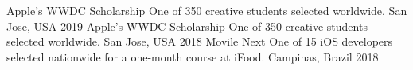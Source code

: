 \begin{cvhonors}
  \cvhonor
    {Apple's WWDC Scholarship}
    {One of 350 creative students selected worldwide.}
    {San Jose, USA}
    {2019}
  \cvhonor
    {Apple's WWDC Scholarship}
    {One of 350 creative students selected worldwide.}
    {San Jose, USA}
    {2018}
  \cvhonor
    {Movile Next}
    {One of 15 iOS developers selected nationwide for a one-month course at iFood.}
    {Campinas, Brazil}
    {2018}
\end{cvhonors}
